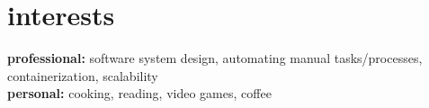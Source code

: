 
\section{interests}

\textbf{professional:} software system design, automating manual tasks/processes, containerization, scalability \\
\textbf{personal:} cooking, reading, video games, coffee
